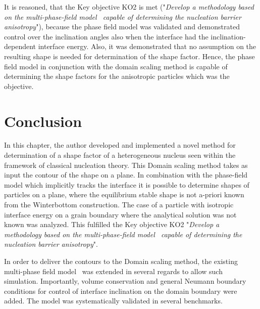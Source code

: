It is reasoned, that the Key objective KO2 is met ("\textit{Develop a methodology based on the multi-phase-field model~\cite{Moelans2008} capable of determining the nucleation barrier anisotropy}"), because the phase field model was validated and demonstrated control over the inclination angles also when the interface had the inclination-dependent interface energy. Also, it was demonstrated that no assumption on the resulting shape is needed for determination of the shape factor. Hence, the phase field model in conjunction with the domain scaling method is capable of determining the shape factors for the anisotropic particles which was the objective.

\section{Conclusion}
In this chapter, the author developed and implemented a novel method for determination of a shape factor of a heterogeneous nucleus seen within the framework of classical nucleation theory. This Domain scaling method takes as input the contour of the shape on a plane. In combination with the phase-field model which implicitly tracks the interface it is possible to determine shapes of particles on a plane, where the equilibrium stable shape is not a-priori known from the Winterbottom construction. The case of a particle with isotropic interface energy on a grain boundary where the analytical solution was not known was analyzed. This fulfilled the Key objective KO2 "\textit{Develop a methodology based on the multi-phase-field model~\cite{Moelans2008} capable of determining the nucleation barrier anisotropy}".

In order to deliver the contours to the Domain scaling method, the existing multi-phase field model~\cite{Moelans2008, Minar2022} was extended in several regards to allow such simulation. Importantly, volume conservation and general Neumann boundary conditions for control of interface inclination on the domain boundary were added. The model was systematically validated in several benchmarks.

